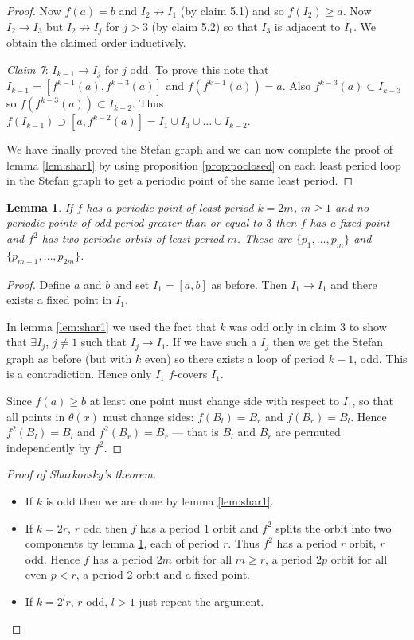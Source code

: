 \documentclass{notes}
\theoremstyle{plain}
\newtheorem{lemma}[proposition]{Lemma}
\begin{document}
\begin{proof}
Now $f(a) = b$ and $I_2 \not \to I_1$ (by claim 5.1) and so $f(I_2)
\ge a$.  Now $I_2 \to I_3$ but $I_2 \not \to I_j$ for $j > 3$ (by
claim 5.2) so that $I_3$ is adjacent to $I_1$.  We obtain the claimed
order inductively.

\vspace{1.5in}

\emph{Claim 7}: $I_{k-1} \to I_j$ for $j$ odd.  To prove this note
that $I_{k-1} = [f^{k-1}(a),f^{k-3}(a)]$ and $f(f^{k-1}(a)) = a$.
Also $f^{k-3}(a) \subset I_{k-3}$ so $f(f^{k-3}(a)) \subset I_{k-2}$.
Thus $f(I_{k-1}) \supset [a,f^{k-2}(a)] = I_1 \cup I_3 \cup \dots \cup
I_{k-2}$.

We have finally proved the Stefan graph and we can now complete the
proof of lemma \ref{lem:shar1} by using proposition
\ref{prop:poclosed} on each least period loop in the Stefan graph to
get a periodic point of the same least period.
\end{proof}

\begin{lemma}\label{lem:shar2}
If $f$ has a periodic point of least period $k = 2m$, $m \ge 1$ and no
periodic points of odd period greater than or equal to $3$ then $f$
has a fixed point and $f^2$ has two periodic orbits of least period
$m$.  These are $\{p_1,\dots,p_m\}$ and $\{p_{m+1},\dots,p_{2m}\}$.
\end{lemma}

\begin{proof}
Define $a$ and $b$ and set $I_1 = [a,b]$ as before.  Then $I_1 \to
I_1$ and there exists a fixed point in $I_1$.

In lemma \ref{lem:shar1} we used the fact that $k$ was odd only in
claim 3 to show that $\exists I_j$, $j \neq 1$ such that $I_j \to
I_1$.  If we have such a $I_j$ then we get the Stefan graph as before
(but with $k$ even) so there exists a loop of period $k-1$, odd.  This
is a contradiction.  Hence only $I_1$ $f$-covers $I_1$.

Since $f(a) \ge b$ at least one point must change side with respect to
$I_1$, so that all points in $\theta(x)$ must change sides: $f(B_l) =
B_r$ and $f(B_r) = B_l$.  Hence $f^2(B_l) = B_l$ and $f^2(B_r) = B_r$
--- that is $B_l$ and $B_r$ are permuted independently by $f^2$.
\end{proof}

\begin{proof}[Proof of Sharkovsky's theorem]\hfill\\
\begin{itemize}
\item If $k$ is odd then we are done by lemma \ref{lem:shar1}.
\item If $k=2r$, $r$ odd then $f$ has a period $1$ orbit and $f^2$ splits the
  orbit into two components by lemma \ref{lem:shar2}, each of period
  $r$.  Thus $f^2$ has a period $r$ orbit, $r$ odd.  Hence $f$ has
  a period $2m$ orbit for all $m \ge r$, a period $2p$ orbit for all
  even $p < r$, a period 2 orbit and a fixed point.
\item If $k=2^l r$, $r$ odd, $l > 1$ just repeat the argument.
\end{itemize}
\end{proof}
\end{document}
